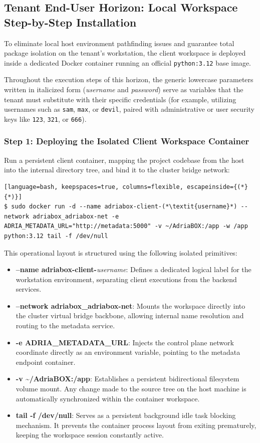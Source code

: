 \subsection{Tenant End-User Horizon: Local Workspace Step-by-Step Installation}
To eliminate local host environment pathfinding issues and guarantee total package isolation on the tenant's workstation, the client workspace is deployed inside a dedicated Docker container running an official \texttt{python:3.12} base image.

Throughout the execution steps of this horizon, the generic lowercase parameters written in italicized form (\textit{username} and \textit{password}) serve as variables that the tenant must substitute with their specific credentials (for example, utilizing usernames such as \texttt{sam}, \texttt{max}, or \texttt{devil}, paired with administrative or user security keys like \texttt{123}, \texttt{321}, or \texttt{666}).

\subsubsection{Step 1: Deploying the Isolated Client Workspace Container}
Run a persistent client container, mapping the project codebase from the host into the internal directory tree, and bind it to the cluster bridge network:
\begin{lstlisting}[language=bash, keepspaces=true, columns=flexible, escapeinside={(*}{*)}]
$ sudo docker run -d --name adriabox-client-(*\textit{username}*) --network adriabox_adriabox-net -e ADRIA_METADATA_URL="http://metadata:5000" -v ~/AdriaBOX:/app -w /app python:3.12 tail -f /dev/null
\end{lstlisting}

This operational layout is structured using the following isolated primitives:
\begin{itemize}
    \item \textbf{--name adriabox-client-}\textit{username}: Defines a dedicated logical label for the workstation environment, separating client executions from the backend services.
    \item \textbf{--network adriabox\_adriabox-net}: Mounts the workspace directly into the cluster virtual bridge backbone, allowing internal name resolution and routing to the metadata service.
    \item \textbf{-e ADRIA\_METADATA\_URL}: Injects the control plane network coordinate directly as an environment variable, pointing to the metadata endpoint container.
    \item \textbf{-v \~{}/AdriaBOX:/app}: Establishes a persistent bidirectional filesystem volume mount. Any change made to the source tree on the host machine is automatically synchronized within the container workspace.
    \item \textbf{tail -f /dev/null}: Serves as a persistent background idle task blocking mechanism. It prevents the container process layout from exiting prematurely, keeping the workspace session constantly active.
\end{itemize}

